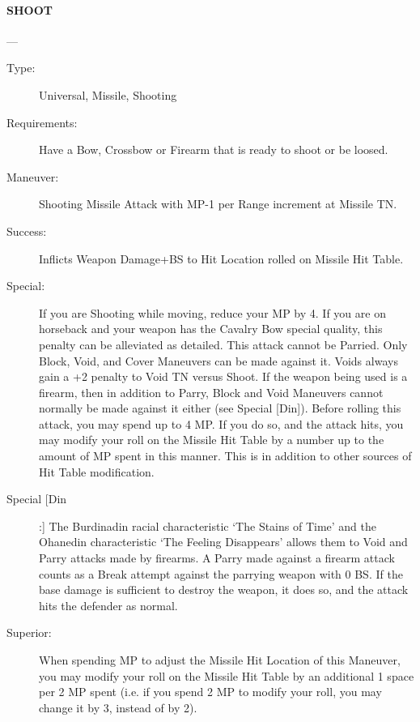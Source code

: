 \documentclass[oneside,11pt,english]{book}
\begin{document}
\paragraph{\large\label{man:SHOOT} SHOOT}---\quad{\large[???????]}
\vspace{-10pt}\begin{description} 
\item [Type:] Universal, Missile, Shooting 
\item [Requirements:] Have a Bow, Crossbow or Firearm that is ready to shoot or be loosed. 
\item [Maneuver:] Shooting Missile Attack with MP-1 per Range increment at Missile TN. 
\item [Success:] Inflicts Weapon Damage+BS to Hit Location rolled on Missile Hit Table. 
\item [Special:] If you are Shooting while moving, reduce your MP by 4. If you are on horseback and your 
weapon has the Cavalry Bow special quality, this penalty can be alleviated as detailed. 
This attack cannot be Parried. Only Block, Void, and Cover Maneuvers can be made against it. 
Voids always gain a +2 penalty to Void TN versus Shoot. 
If the weapon being used is a firearm, then in addition to Parry, Block and Void Maneuvers cannot 
normally be made against it either (see Special [Din]). 
Before rolling this attack, you may spend up to 4 MP. If you do so, and the attack hits, you may modify 
your roll on the Missile Hit Table by a number up to the amount of MP spent in this manner. This is in 
addition to other sources of Hit Table modification. 
\item [Special [Din]:] The Burdinadin racial characteristic ‘The Stains of Time’ and the Ohanedin characteristic 
‘The Feeling Disappears’ allows them to Void and Parry attacks made by firearms. A Parry made against 
a firearm attack counts as a Break attempt against the parrying weapon with 0 BS. If the base damage is 
sufficient to destroy the weapon, it does so, and the attack hits the defender as normal. 
\item [Superior:] When spending MP to adjust the Missile Hit Location of this Maneuver, you may modify your 
roll on the Missile Hit Table by an additional 1 space per 2 MP spent (i.e. if you spend 2 MP to modify 
your roll, you may change it by 3, instead of by 2). 
\end{description}
\end{document}
